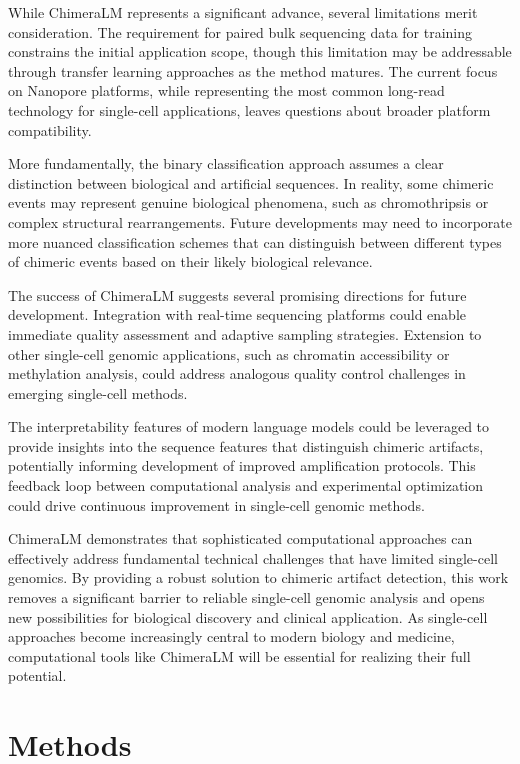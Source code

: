 \documentclass[pdflatex,sn-nature]{sn-jnl}%
\theoremstyle{thmstyleone}%
\theoremstyle{thmstyletwo}%
\theoremstyle{thmstylethree}%
\begin{document}
While ChimeraLM represents a significant advance, several limitations merit consideration.
The requirement for paired bulk sequencing data for training constrains the initial application scope, though this limitation may be addressable through transfer learning approaches as the method matures.
The current focus on Nanopore platforms, while representing the most common long-read technology for single-cell applications, leaves questions about broader platform compatibility.

More fundamentally, the binary classification approach assumes a clear distinction between biological and artificial sequences.
In reality, some chimeric events may represent genuine biological phenomena, such as chromothripsis or complex structural rearrangements.
Future developments may need to incorporate more nuanced classification schemes that can distinguish between different types of chimeric events based on their likely biological relevance.

The success of ChimeraLM suggests several promising directions for future development.
Integration with real-time sequencing platforms could enable immediate quality assessment and adaptive sampling strategies.
Extension to other single-cell genomic applications, such as chromatin accessibility or methylation analysis, could address analogous quality control challenges in emerging single-cell methods.

The interpretability features of modern language models could be leveraged to provide insights into the sequence features that distinguish chimeric artifacts, potentially informing development of improved amplification protocols.
This feedback loop between computational analysis and experimental optimization could drive continuous improvement in single-cell genomic methods.

ChimeraLM demonstrates that sophisticated computational approaches can effectively address fundamental technical challenges that have limited single-cell genomics.
By providing a robust solution to chimeric artifact detection, this work removes a significant barrier to reliable single-cell genomic analysis and opens new possibilities for biological discovery and clinical application.
As single-cell approaches become increasingly central to modern biology and medicine, computational tools like ChimeraLM will be essential for realizing their full potential.

\section*{Methods}\label{sec:methods}
\end{document}
